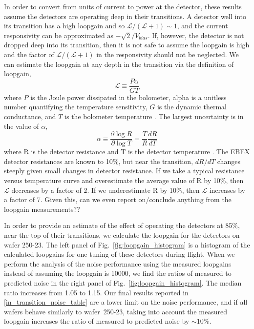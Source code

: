 In order to convert from units of current to power at the detector, these results assume the detectors are operating deep in their transitions. 
A detector well into its transition has a high loopgain and so $\mathcal{L}/(\mathcal{L} + 1) \sim 1$, and the current responsivity can be approximated as $-\sqrt{2}/V_{bias}$. 
If, however, the detector is not dropped deep into its transition, then it is not safe to assume the loopgain is high and the factor of  $\mathcal{L}/(\mathcal{L} + 1)$ in the responsivity should not be neglected. 
We can estimate the loopgain at any depth in the transition via the definition of loopgain, 
\begin{equation}
\mathcal{L} \equiv \frac{P\alpha}{GT}
\end{equation}
where $P$ is the Joule power dissipated in the bolometer, alpha is a unitless number quantifying the temperature sensitivity, $G$ is the dynamic thermal conductance, and $T$ is the bolometer temperature \cite{Enss2005}. 
The largest uncertainty is in the value of $\alpha$, 
 \begin{equation}
 \alpha \equiv \frac{\partial \log R}{\partial \log T}=\frac{T}{R} \frac{dR}{dT}
 \end{equation}
 where R is the detector resistance and T is the detector temperature \cite{Enss2005}. 
The \ac{EBEX} detector resistances are known to 10\%, but near the transition, $dR/dT$ changes steeply given small changes in detector resistance. 
If we take a typical resistance versus temperature curve and overestimate the average value of R by 10\%, then $\mathcal{L}$ decreases by a factor of 2.
If we underestimate R by 10\%, then $\mathcal{L}$ increases by a factor of 7. 
Given this, can we even report on/conclude anything from the loopgain measurements??

In order to provide an estimate of the effect of operating the detectors at 85\%, near the top of their transitions, we calculate the loopgain for the detectors on wafer 250-23. 
The left panel of Fig.~\ref{fig:loopgain_histogram} is a histogram of the calculated loopgains for one tuning of these detectors during flight. 
When we perform the analysis of the noise performance using the measured loopgains instead of assuming the loopgain is 10000, we find the ratios of measured to predicted noise in the right panel of Fig.~\ref{fig:loopgain_histogram}. 
The median ratio increases from 1.05 to 1.15. 
Our final results reported in \TAB\ref{in_transition_noise_table} are a lower limit on the noise performance, and if all wafers behave similarly to wafer~250-23, taking into account the measured loopgain increases the ratio of measured to predicted noise by $\sim$10\%. 


